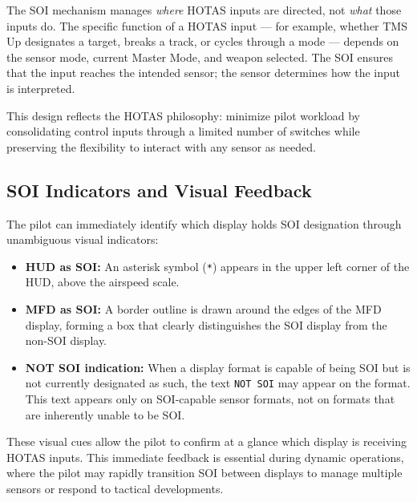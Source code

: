 \documentclass[11pt, a4paper, twoside]{report}
\begin{document}
The SOI mechanism manages \textit{where} HOTAS inputs are directed, not \textit{what} those inputs do. The specific function of a HOTAS input — for example, whether TMS Up designates a target, breaks a track, or cycles through a mode — depends on the sensor mode, current Master Mode, and weapon selected. The SOI ensures that the input reaches the intended sensor; the sensor determines how the input is interpreted.

This design reflects the HOTAS philosophy: minimize pilot workload by consolidating control inputs through a limited number of switches while preserving the flexibility to interact with any sensor as needed.


\subsection{SOI Indicators and Visual Feedback}
\label{sec:C2-S1-S2}

The pilot can immediately identify which display holds SOI designation through unambiguous visual indicators:

\begin{itemize}
	\item \textbf{HUD as SOI:} An asterisk symbol (\texttt{*}) appears in the upper left corner of the HUD, above the airspeed scale.
	\item \textbf{MFD as SOI:} A border outline is drawn around the edges of the MFD display, forming a box that clearly distinguishes the SOI display from the non-SOI display.
	\item \textbf{NOT SOI indication:} When a display format is capable of being SOI but is not currently designated as such, the text \texttt{NOT SOI} may appear on the format. This text appears only on SOI-capable sensor formats, not on formats that are inherently unable to be SOI.
\end{itemize}

These visual cues allow the pilot to confirm at a glance which display is receiving HOTAS inputs. This immediate feedback is essential during dynamic operations, where the pilot may rapidly transition SOI between displays to manage multiple sensors or respond to tactical developments.

\end{document}
